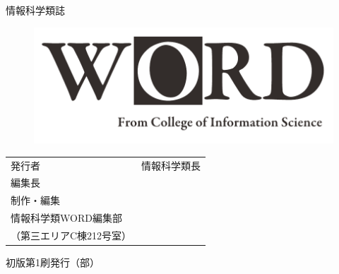 \documentclass[../../main]{subfiles}
\begin{document}
\makeatletter
\newcommand*{\circulation}[1]{\gdef\@circulation{#1}}
\makeatother
\pagestyle{empty}
\setlength{\parindent}{0pt}
\newcommand*{\vstretch}[1]{\vspace*{\stretch{#1}}}



{\Huge 情報科学類誌}
\begin{figure}[h]
  \centering
  \includegraphics[width=\textwidth]{wordlogo.pdf}
\end{figure}

\vstretch{3}

\makeatletter
\begin{center}
  {\HUGE \@title}
\end{center}

\vstretch{4}

\begin{framed}
  \centering
  \Huge
  \begin{tabular}{ll}
    発行者 & 情報科学類長 \\
    編集長 & \@author{} \\
    制作・編集 & \shortstack[l]{%
                  筑波大学情報学群 \\%
                  情報科学類WORD編集部 \\%
                  （第三エリアC棟212号室）}
  \end{tabular}

  \vspace*{0.3em}

  {\LARGE \@date{}\hspace{1em}初版第1刷発行\hfill{}（\@circulation{}部）}

  \vspace*{0.2em}
\end{framed}
\makeatother
\end{document}
